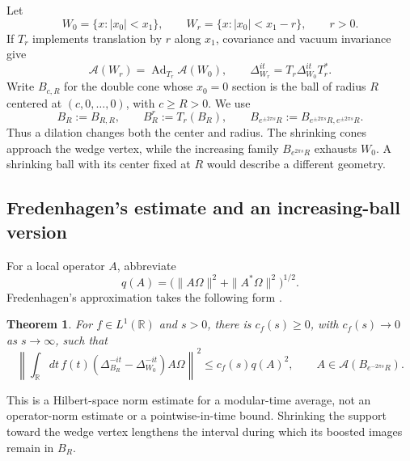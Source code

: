 \documentclass[a4paper,11pt]{article}
\newtheorem{theorem}{Theorem}
\theoremstyle{definition}
\begin{document}
Let
\begin{equation}
 W_0=\{x:|x_0|<x_1\},\qquad
 W_r=\{x:|x_0|<x_1-r\},\qquad r>0.
\end{equation}
If $T_r$ implements translation by $r$ along $x_1$, covariance and vacuum invariance give
\begin{equation}
 \mathcal A(W_r)=\operatorname{Ad}_{T_r}\mathcal A(W_0),
 \qquad \Delta_{W_r}^{it}=T_r\Delta_{W_0}^{it}T_r^*.
\end{equation}
Write $B_{c,R}$ for the double cone whose $x_0=0$ section is the ball of radius $R$ centered at $(c,0,\ldots,0)$, with $c\geq R>0$. We use
\begin{equation}
 B_R:=B_{R,R},\qquad B_R^r:=T_r(B_R),\qquad
 B_{e^{\pm2\pi s}R}:=B_{e^{\pm2\pi s}R,e^{\pm2\pi s}R}.
 \label{eq:approx-ball-notation}
\end{equation}
Thus a dilation changes both the center and radius. The shrinking cones approach the wedge vertex, while the increasing family $B_{e^{2\pi s}R}$ exhausts $W_0$. A shrinking ball with its center fixed at $R$ would describe a different geometry.

\subsection{Fredenhagen's estimate and an increasing-ball version}

For a local operator $A$, abbreviate
\begin{equation}
 q(A)=\bigl(\|A\Omega\|^2+\|A^*\Omega\|^2\bigr)^{1/2}.
\end{equation}
Fredenhagen's approximation takes the following form \cite{fredenhagen}.
\begin{theorem}
For $f\in L^1(\mathbb R)$ and $s>0$, there is $c_f(s)\geq0$, with $c_f(s)\to0$ as $s\to\infty$, such that
\begin{equation}
 \left\|\int_{\mathbb R}dt\,f(t)
 (\Delta_{B_R}^{-it}-\Delta_{W_0}^{-it})A\Omega\right\|^2
 \leq c_f(s)q(A)^2,
 \qquad A\in\mathcal A(B_{e^{-2\pi s}R}).
\end{equation}
\end{theorem}
This is a Hilbert-space norm estimate for a modular-time average, not an operator-norm estimate or a pointwise-in-time bound. Shrinking the support toward the wedge vertex lengthens the interval during which its boosted images remain in $B_R$.
\end{document}
